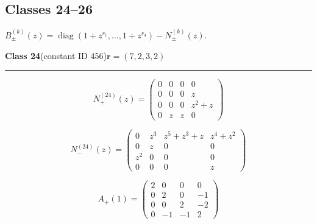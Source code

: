 \subsection*{Classes 24--26}
\noindent $B_\pm^{(k)}(z)=\operatorname{diag}(1+z^{r_1},\ldots,1+z^{r_4})-N_\pm^{(k)}(z)$.\par\medskip
\noindent\begin{minipage}{\linewidth}
\noindent\textbf{Class 24}\quad\small (constant ID 456)\hfill $\symbf{r}=(7,2,3,2)$
\par\smallskip\noindent\textcolor{rulegray}{\rule{\linewidth}{0.3pt}}
\begin{minipage}[c]{0.495\linewidth}\centering\fontsize{9.7}{12}\selectfont
\setlength{\abovedisplayskip}{4pt}\setlength{\belowdisplayskip}{4pt}
\setlength{\abovedisplayshortskip}{4pt}\setlength{\belowdisplayshortskip}{4pt}
\setlength{\arraycolsep}{3pt}\renewcommand{\arraystretch}{1.08}
\[N_{+}^{(24)}(z)=\begin{pmatrix}0 & 0 & 0 & 0\\0 & 0 & 0 & z\\0 & 0 & 0 & z^{2} + z\\0 & z & z & 0\end{pmatrix}\]
\end{minipage}%
\begin{minipage}[c]{0.495\linewidth}\centering\fontsize{9.7}{12}\selectfont
\setlength{\abovedisplayskip}{4pt}\setlength{\belowdisplayskip}{4pt}
\setlength{\abovedisplayshortskip}{4pt}\setlength{\belowdisplayshortskip}{4pt}
\setlength{\arraycolsep}{3pt}\renewcommand{\arraystretch}{1.08}
\[N_{-}^{(24)}(z)=\begin{pmatrix}0 & z^{3} & z^{5} + z^{3} + z & z^{4} + z^{2}\\0 & z & 0 & 0\\z^{2} & 0 & 0 & 0\\0 & 0 & 0 & z\end{pmatrix}\]
\end{minipage}%
\par\noindent
\begin{minipage}[c]{0.495\linewidth}\centering\fontsize{9.7}{12}\selectfont
\setlength{\abovedisplayskip}{4pt}\setlength{\belowdisplayskip}{4pt}
\setlength{\abovedisplayshortskip}{4pt}\setlength{\belowdisplayshortskip}{4pt}
\setlength{\arraycolsep}{3pt}\renewcommand{\arraystretch}{1.08}
\[A_{+}(1)=\begin{pmatrix}2 & 0 & 0 & 0\\0 & 2 & 0 & -1\\0 & 0 & 2 & -2\\0 & -1 & -1 & 2\end{pmatrix}\]

\end{minipage}
\end{minipage}
